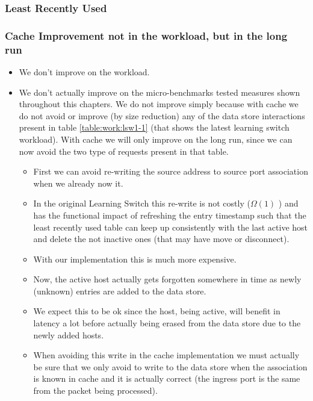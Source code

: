\subsubsection{Least Recently Used} 

\subsubsection{Cache Improvement not in the workload, but in the long
  run}
\begin{itemize}
\item We don't improve on the workload.  
\item We don't actually improve on the micro-benchmarks tested measures
shown throughout this chapters. We do not improve simply because with
cache we do not avoid or improve (by size reduction) any of the data store interactions
present in table \ref{table:work:lsw1-1} (that shows the latest
learning switch workload).  With cache we will only improve on the
long run, since we can now avoid the two type of requests present in
that table.

\begin{itemize}
\item First we can avoid re-writing the source address to source
port association when we already now it. 

\item In the original Learning Switch this re-write is not costly ($\Omega(1)$ ) and
  has the functional impact of refreshing the entry timestamp such that
  the least recently used table can keep up consistently with the last
  active host and delete the not inactive ones (that may have move or disconnect). 

\item  With our implementation this is much more expensive. 

\item Now, the active host
actually gets forgotten somewhere in time as newly (unknown) entries
are added to the data store. 

\item We expect this to be ok since the host,
being active, will benefit in latency a lot before actually being
erased from the data store due to the newly added hosts. 

\item When avoiding this write
in the cache implementation we must actually be sure that we only
avoid to write to the data store when the association is known in
cache and it is actually correct (the ingress port is the same from
the packet being processed). 
\end{itemize}


\end{itemize}
